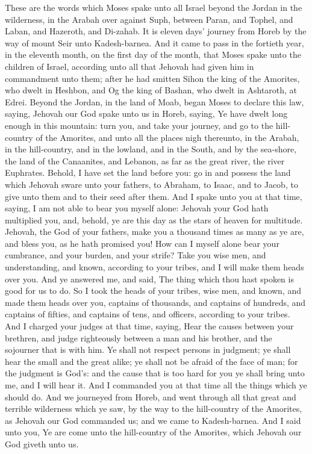 


These are the words which Moses spake unto all Israel beyond the Jordan in the wilderness, in the Arabah over against Suph, between Paran, and Tophel, and Laban, and Hazeroth, and Di-zahab. It is eleven days’ journey from Horeb by the way of mount Seir unto Kadesh-barnea. And it came to pass in the fortieth year, in the eleventh month, on the first day of the month, that Moses spake unto the children of Israel, according unto all that Jehovah had given him in commandment unto them; after he had smitten Sihon the king of the Amorites, who dwelt in Heshbon, and Og the king of Bashan, who dwelt in Ashtaroth, at Edrei. Beyond the Jordan, in the land of Moab, began Moses to declare this law, saying, Jehovah our God spake unto us in Horeb, saying, Ye have dwelt long enough in this mountain: turn you, and take your journey, and go to the hill-country of the Amorites, and unto all the places nigh thereunto, in the Arabah, in the hill-country, and in the lowland, and in the South, and by the sea-shore, the land of the Canaanites, and Lebanon, as far as the great river, the river Euphrates. Behold, I have set the land before you: go in and possess the land which Jehovah sware unto your fathers, to Abraham, to Isaac, and to Jacob, to give unto them and to their seed after them.  And I spake unto you at that time, saying, I am not able to bear you myself alone: Jehovah your God hath multiplied you, and, behold, ye are this day as the stars of heaven for multitude. Jehovah, the God of your fathers, make you a thousand times as many as ye are, and bless you, as he hath promised you! How can I myself alone bear your cumbrance, and your burden, and your strife? Take you wise men, and understanding, and known, according to your tribes, and I will make them heads over you. And ye answered me, and said, The thing which thou hast spoken is good for us to do. So I took the heads of your tribes, wise men, and known, and made them heads over you, captains of thousands, and captains of hundreds, and captains of fifties, and captains of tens, and officers, according to your tribes. And I charged your judges at that time, saying, Hear the causes between your brethren, and judge righteously between a man and his brother, and the sojourner that is with him. Ye shall not respect persons in judgment; ye shall hear the small and the great alike; ye shall not be afraid of the face of man; for the judgment is God’s: and the cause that is too hard for you ye shall bring unto me, and I will hear it. And I commanded you at that time all the things which ye should do.  And we journeyed from Horeb, and went through all that great and terrible wilderness which ye saw, by the way to the hill-country of the Amorites, as Jehovah our God commanded us; and we came to Kadesh-barnea. And I said unto you, Ye are come unto the hill-country of the Amorites, which Jehovah our God giveth unto us. 